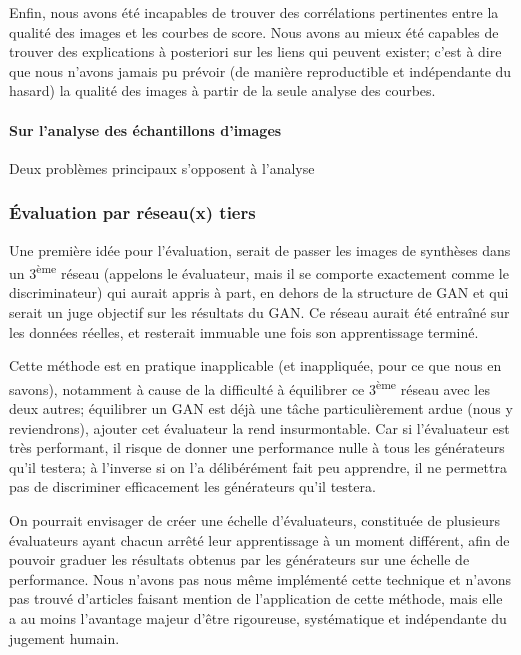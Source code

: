 Enfin, nous avons été incapables de trouver des corrélations pertinentes entre la qualité des images et les courbes de score. Nous avons au mieux été capables de trouver des explications à posteriori sur les liens qui peuvent exister; c'est à dire que nous n'avons jamais pu prévoir (de manière reproductible et indépendante du hasard) la qualité des images à partir de la seule analyse des courbes.

\paragraph{Sur l'analyse des échantillons d'images}

Deux problèmes principaux s'opposent à l'analyse 

\subsubsection{Évaluation par réseau(x) tiers}

Une première idée pour l'évaluation, serait de passer les images de synthèses dans un 3\textsuperscript{ème} réseau (appelons le évaluateur, mais il se comporte exactement comme le discriminateur) qui aurait appris à part, en dehors de la structure de GAN et qui serait un juge objectif sur les résultats du GAN. Ce réseau aurait été entraîné sur les données réelles, et resterait immuable une fois son apprentissage terminé. 

Cette méthode est en pratique inapplicable (et inappliquée, pour ce que nous en savons), notamment à cause de la difficulté à équilibrer ce 3\textsuperscript{ème} réseau avec les deux autres; équilibrer un GAN est déjà une tâche particulièrement ardue (nous y reviendrons), ajouter cet évaluateur la rend insurmontable. Car si l'évaluateur est très performant, il risque de donner une performance nulle à tous les générateurs qu'il testera; à l'inverse si on l'a délibérément fait peu apprendre, il ne permettra pas de discriminer efficacement les générateurs qu'il testera.

On pourrait envisager de créer une échelle d'évaluateurs, constituée de plusieurs évaluateurs ayant chacun arrêté leur apprentissage à un moment différent, afin de pouvoir graduer les résultats obtenus par les générateurs sur une échelle de performance. Nous n'avons pas nous même implémenté cette technique et n'avons pas trouvé d'articles faisant mention de l'application de cette méthode, mais elle a au moins l'avantage majeur d'être rigoureuse, systématique et indépendante du jugement humain.

